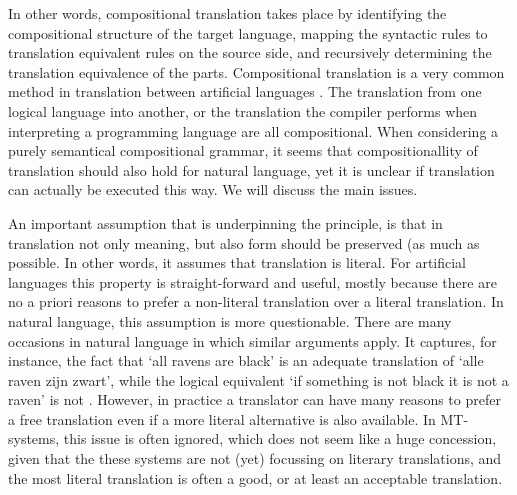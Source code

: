 \documentclass{report}
\theoremstyle{definition}
\theoremstyle{plain}
\begin{document}
In other words, compositional translation takes place by identifying the compositional structure of the target language, mapping the syntactic rules to translation equivalent rules on the source side, and recursively determining the translation equivalence of the parts. Compositional translation is a very common method in translation between artificial languages \citep{janssen1996compositionality,janssen1998algebraic}. The translation from one logical language into another, or the translation the compiler performs when interpreting a programming language are all compositional. When considering a purely semantical compositional grammar, it seems that compositionallity of translation should also hold for natural language, yet it is unclear if translation can actually be executed this way. We will discuss the main issues.

An important assumption that is underpinning the principle, is that in translation not only meaning, but also form should be preserved (as much as possible. In other words, it assumes that translation is literal. For artificial languages this property is straight-forward and useful, mostly because there are no a priori reasons to prefer a non-literal translation over a literal translation. In natural language, this assumption is more questionable. There are many occasions in natural language in which similar arguments apply. It captures, for instance, the fact that `all ravens are black' is an adequate translation of `alle raven zijn zwart', while the logical equivalent `if something is not black it is not a raven' is not \citep{landsbergen1989power}. However, in practice a translator can have many reasons to prefer a free translation even if a more literal alternative is also available. In MT-systems, this issue is often ignored, which does not seem like a huge concession, given that the these systems are not (yet) focussing on literary translations, and the most literal translation is often a good, or at least an acceptable translation.
\end{document}
